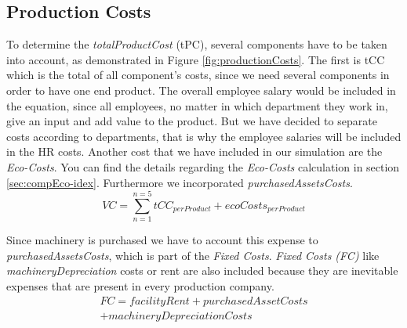 \subsection{Production Costs}
\label{prodCosts_simulation}

To determine the \textit{totalProductCost} (\gls{tPC}), several components have to be taken into account, as demonstrated in Figure \ref{fig:productionCosts}. The first is \gls{tCC}
which is the total of all component's costs, since we need several components in order to have one end product. The overall employee salary would be included in the equation, since all employees, no matter in which department they work in, give an input and add value to the product. But we have decided to separate costs according to departments, that is why the employee salaries will be included in the HR costs. Another cost that we have included in our simulation are the \textit{Eco-Costs}. You can find the details regarding the \textit{Eco-Costs} calculation in section \ref{sec:compEco-idex}. Furthermore we incorporated \textit{purchasedAssetsCosts}. 
\begin{equation}
       VC = \sum_{n=1}^{n=5}tCC_{perProduct} + ecoCosts_{perProduct}
   \end{equation}

Since machinery is purchased we have to account this expense to \textit{purchasedAssetsCosts}, which is part of the \textit{Fixed Costs}. \textit{Fixed Costs (FC)} like \textit{machineryDepreciation} costs or rent are also included because they are inevitable expenses that are present in every production company. 
\begin{equation}
   \begin{aligned}
 FC = facilityRent + purchasedAssetCosts \\ +machineryDepreciationCosts
   \end{aligned}
   \end{equation}

